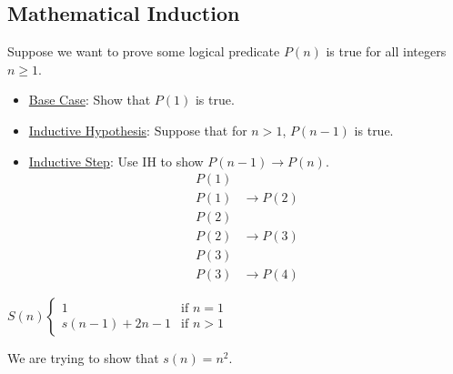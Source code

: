 \documentclass{article}
\begin{document}
\newpage

    \subsection{Mathematical Induction}
        \setcounter{example}{0}
        \begin{example}
            Suppose we want to prove some logical predicate $P(n)$ is true for all integers $n\geq 1$.
        \end{example}

        \begin{itemize}
            \item \underline{Base Case}: Show that $P(1)$ is true. \\
            
            \item \underline{Inductive Hypothesis}: Suppose that for $n > 1$, $P(n-1)$ is true. \\
            
            \item \underline{Inductive Step}: Use IH to show $P(n-1) \rightarrow P(n)$.
            \begin{align*}
                P(1) \\
                P(1) &\rightarrow P(2) \\
                P(2) \\
                P(2) &\rightarrow P(3) \\
                P(3) \\
                P(3) &\rightarrow P(4)
            \end{align*}
        \end{itemize}

        \begin{example}
            $S(n)
            \begin{cases}
                1 &\text{if } n = 1 \\
                s(n-1) + 2n - 1 &\text{if } n > 1 
            \end{cases}$
        \end{example}

        We are trying to show that $s(n) = n^2$. \\
\end{document}
